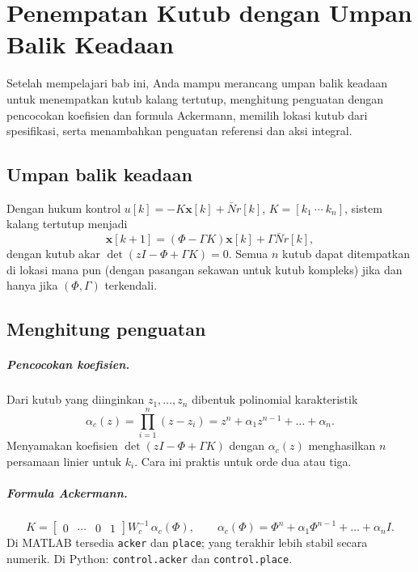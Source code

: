 \chapter{Penempatan Kutub dengan Umpan Balik Keadaan}
\label{bab:pp}

\begin{tujuan}
	Setelah mempelajari bab ini, Anda mampu merancang umpan balik keadaan untuk menempatkan kutub kalang tertutup, menghitung penguatan dengan pencocokan koefisien dan formula Ackermann, memilih lokasi kutub dari spesifikasi, serta menambahkan penguatan referensi dan aksi integral.
\end{tujuan}

\section{Umpan balik keadaan}
Dengan hukum kontrol $u[k] = -K\mathbf{x}[k] + \bar Nr[k]$, $K = [k_1\ \cdots\ k_n]$, sistem kalang tertutup menjadi
\begin{equation}
	\mathbf{x}[k+1] = (\Phi - \Gamma K)\mathbf{x}[k] + \Gamma\bar Nr[k],
\end{equation}
dengan kutub akar $\det(zI - \Phi + \Gamma K) = 0$. Semua $n$ kutub dapat ditempatkan di lokasi mana pun (dengan pasangan sekawan untuk kutub kompleks) jika dan hanya jika $(\Phi, \Gamma)$ terkendali.

\section{Menghitung penguatan}
\paragraph{Pencocokan koefisien.} Dari kutub yang diinginkan $z_1, \dots, z_n$ dibentuk polinomial karakteristik
\begin{equation}
	\alpha_c(z) = \prod_{i=1}^{n}(z - z_i) = z^n + \alpha_1z^{n-1} + \dots + \alpha_n.
\end{equation}
Menyamakan koefisien $\det(zI - \Phi + \Gamma K)$ dengan $\alpha_c(z)$ menghasilkan $n$ persamaan linier untuk $k_i$. Cara ini praktis untuk orde dua atau tiga.

\paragraph{Formula Ackermann.}
\begin{equation}
	K = \begin{bmatrix}0 & \cdots & 0 & 1\end{bmatrix}W_c^{-1}\,\alpha_c(\Phi),\qquad \alpha_c(\Phi) = \Phi^n + \alpha_1\Phi^{n-1} + \dots + \alpha_nI.
\end{equation}
Di MATLAB tersedia \texttt{acker} dan \texttt{place}; yang terakhir lebih stabil secara numerik. Di Python: \texttt{control.acker} dan \texttt{control.place}.

